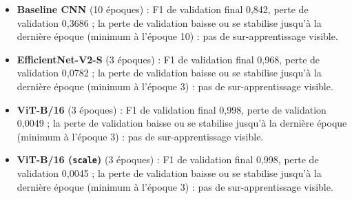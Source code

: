 \begin{itemize}
\item \textbf{Baseline CNN} (10 époques) : F1 de validation final 0{,}842, perte de validation 0{,}3686 ; la perte de validation baisse ou se stabilise jusqu'à la dernière époque (minimum à l'époque 10) : pas de sur-apprentissage visible.
\item \textbf{EfficientNet-V2-S} (3 époques) : F1 de validation final 0{,}968, perte de validation 0{,}0782 ; la perte de validation baisse ou se stabilise jusqu'à la dernière époque (minimum à l'époque 3) : pas de sur-apprentissage visible.
\item \textbf{ViT-B/16} (3 époques) : F1 de validation final 0{,}998, perte de validation 0{,}0049 ; la perte de validation baisse ou se stabilise jusqu'à la dernière époque (minimum à l'époque 3) : pas de sur-apprentissage visible.
\item \textbf{ViT-B/16 (\texttt{scale})} (3 époques) : F1 de validation final 0{,}998, perte de validation 0{,}0045 ; la perte de validation baisse ou se stabilise jusqu'à la dernière époque (minimum à l'époque 3) : pas de sur-apprentissage visible.
\end{itemize}
